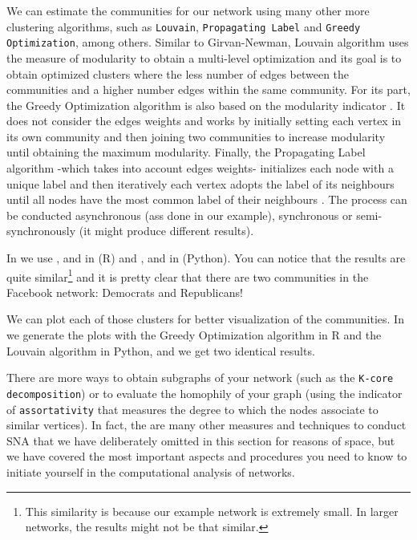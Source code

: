 We can estimate the communities for our network using many other more clustering algorithms, such as \texttt{Louvain}, \texttt{Propagating Label} and \texttt{Greedy Optimization}, among others. Similar to Girvan-Newman, Louvain algorithm uses the measure of modularity to obtain a multi-level optimization \citep{blondel2008fast} and its goal is to obtain optimized clusters where the less number of edges between the communities and a higher number edges within the same community. For its part, the Greedy Optimization algorithm is also based on the modularity indicator \citep{clauset2004finding}. It does not consider the edges weights and works by initially setting each vertex in its own community and then joining two communities to increase modularity until obtaining the maximum modularity. Finally, the Propagating Label algorithm -which takes into account edges weights- initializes each node with a unique label and then iteratively each vertex adopts the label of its neighbours until all nodes have the most common label of their neighbours \citep{raghavan2007near}. The process can be conducted asynchronous (ass done in our example), synchronous or semi-synchronously (it might produce different results).

In  we use ,  and  in  (R) and ,  and  in  (Python). You can notice  that the results are quite similar\footnote{This similarity is because our example network is extremely small. In larger networks, the results might not be that similar.}  and it is pretty clear that there are two communities in the Facebook network: Democrats and Republicans!


We can plot each of those clusters for better visualization of the communities. In  we generate the plots with the Greedy Optimization algorithm in R and the Louvain algorithm in Python, and we get two identical results.


There are more ways to obtain subgraphs of your network (such as the \texttt{K-core decomposition}) or to evaluate the homophily of your graph (using the indicator of \texttt{assortativity} that measures the degree to which the nodes associate to similar vertices). In fact, the are many other measures and techniques to conduct SNA that we have deliberately omitted in this section for reasons of space, but we have covered the most important aspects and procedures you need to know to initiate yourself in the computational analysis of networks.

